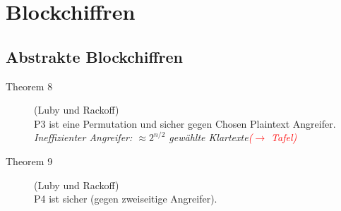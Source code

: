 \documentclass[10pt,a4paper]{article}
\begin{document}
\section{Blockchiffren}
\subsection{Abstrakte Blockchiffren}
\begin{description}
	\item[Theorem 8] (Luby und Rackoff)\\ P3 ist eine Permutation und sicher gegen Chosen Plaintext Angreifer.\\
\textit{Ineffizienter Angreifer: $\approx 2^{n/2}$ gewählte Klartexte\textcolor{red}{($\to$ Tafel)}}
	\item[Theorem 9] (Luby und Rackoff)\\ P4 ist sicher (gegen zweiseitige Angreifer).
\end{description}
\end{document}
